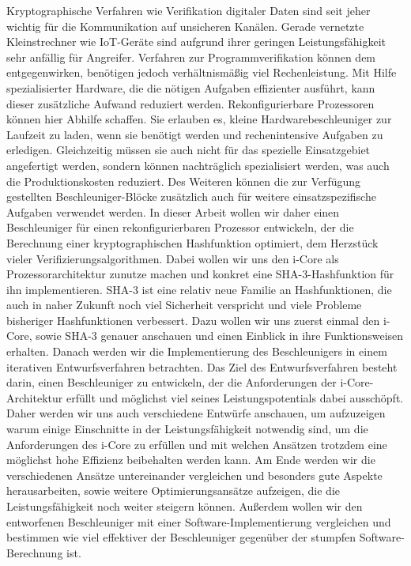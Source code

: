 Kryptographische Verfahren wie Verifikation digitaler Daten sind seit jeher wichtig für die Kommunikation auf unsicheren Kanälen.
Gerade vernetzte Kleinstrechner wie IoT-Geräte sind aufgrund ihrer geringen Leistungsfähigkeit sehr anfällig für Angreifer.
Verfahren zur Programmverifikation können dem entgegenwirken, benötigen jedoch verhältnismäßig viel Rechenleistung.
Mit Hilfe spezialisierter Hardware, die die nötigen Aufgaben effizienter ausführt, kann dieser zusätzliche Aufwand reduziert werden.
Rekonfigurierbare Prozessoren können hier Abhilfe schaffen. Sie erlauben es, kleine Hardwarebeschleuniger zur Laufzeit zu laden,
wenn sie benötigt werden und rechenintensive Aufgaben zu erledigen. Gleichzeitig müssen sie auch nicht für das spezielle
Einsatzgebiet angefertigt werden, sondern können nachträglich spezialisiert werden, was auch die Produktionskosten reduziert.
Des Weiteren können die zur Verfügung gestellten Beschleuniger-Blöcke zusätzlich auch für weitere einsatzspezifische Aufgaben verwendet werden.
In dieser Arbeit wollen wir daher einen Beschleuniger für einen rekonfigurierbaren Prozessor entwickeln, der die Berechnung einer
kryptographischen Hashfunktion optimiert, dem Herzstück vieler Verifizierungsalgorithmen. Dabei wollen wir uns den i-Core als Prozessorarchitektur
zunutze machen und konkret eine SHA-3-Hashfunktion für ihn implementieren. SHA-3 ist eine relativ neue Familie an Hashfunktionen,
die auch in naher Zukunft noch viel Sicherheit verspricht und viele Probleme bisheriger Hashfunktionen verbessert.
Dazu wollen wir uns zuerst einmal den i-Core, sowie SHA-3 genauer anschauen und einen Einblick in ihre Funktionsweisen erhalten.
Danach werden wir die Implementierung des Beschleunigers in einem iterativen Entwurfsverfahren betrachten. Das Ziel des
Entwurfsverfahren besteht darin, einen Beschleuniger zu entwickeln, der die Anforderungen der i-Core-Architektur erfüllt
und möglichst viel seines Leistungspotentials dabei ausschöpft. Daher werden wir uns auch verschiedene Entwürfe anschauen,
um aufzuzeigen warum einige Einschnitte in der Leistungsfähigkeit notwendig sind, um die Anforderungen des i-Core zu erfüllen
und mit welchen Ansätzen trotzdem eine möglichst hohe Effizienz beibehalten werden kann. Am Ende werden wir die verschiedenen
Ansätze untereinander vergleichen und besonders gute Aspekte herausarbeiten, sowie weitere Optimierungsansätze aufzeigen,
die die Leistungsfähigkeit noch weiter steigern können. Außerdem wollen wir den entworfenen Beschleuniger mit einer
Software-Implementierung vergleichen und bestimmen wie viel effektiver der Beschleuniger gegenüber der stumpfen Software-Berechnung ist.